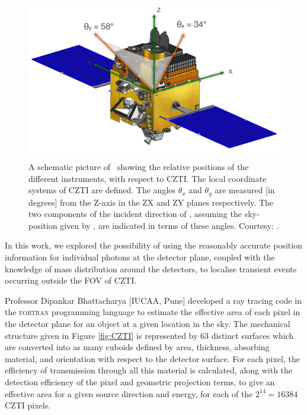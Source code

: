 \begin{figure}
\begin{center}
\includegraphics[scale=0.33]{GRB151006A--AstroSat}
\caption[Schematic diagram of the \s\ position of \grb\ with respect to local CZTI co-ordinates]{A schematic picture of \AS\ showing the relative positions of the different instruments, with respect to CZTI. The local coordinate systems of CZTI are defined. The angles $\theta_x$ and $\theta_y$ are measured [in degrees] from the Z-axis in the ZX and ZY planes respectively. The two components of the incident direction of \grb, assuming the sky-position given by \s, are indicated in terms of these angles. Courtesy: \cite{Rao_et_al.-2016-ApJ}.}
\label{fig:GRB151006A--Swift_position}
\end{center}
\end{figure}


In this work, we explored the possibility of using the reasonably accurate position information for individual photons at the detector plane, coupled with the knowledge of mass distribution around the detectors, to localise transient events occurring outside the FOV of CZTI.

Professor Dipankar Bhattacharya [IUCAA, Pune] developed a ray tracing code in the \textsc{fortran} programming language to estimate the effective area of each pixel in the detector plane for an object at a given location in the sky. The mechanical structure given in Figure \ref{fig:CZTI} is represented by $63$ distinct surfaces which are converted into as many cuboids defined by area, thickness, absorbing material, and orientation with respect to the detector surface. For each pixel, the efficiency of transmission through all this material is calculated, along with the detection efficiency of the pixel and geometric projection terms, to give an effective area for a given source direction and energy, for each of the $2^{14} = 16384$ CZTI pixels.

